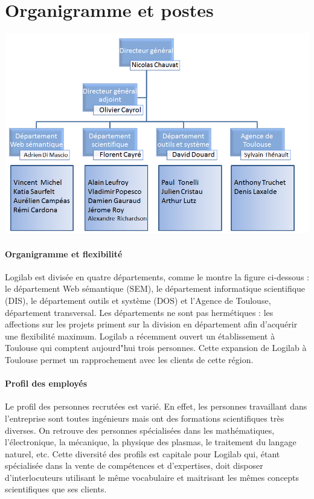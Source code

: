 \documentclass {report}
\begin{document}
\section{Organigramme et postes}

\begin{center}
\includegraphics[scale=0.7]{organigramme.png}
\end{center}



\paragraph{Organigramme et flexibilité}
Logilab est divisée en quatre départements, comme le montre la figure ci-dessous : le département Web sémantique (SEM), le département informatique scientifique (DIS), le département outils et système (DOS) et l'Agence de Toulouse, département transversal. Les départements ne sont pas hermétiques : les affections sur les projets priment sur la division en département afin d'acquérir une flexibilité maximum. Logilab a récemment ouvert un établissement à Toulouse qui comptent aujourd"hui trois personnes. Cette expansion de Logilab à Toulouse permet un rapprochement avec les clients de cette région.

\paragraph{Profil des employés}
Le profil des personnes recrutées est varié. En effet, les personnes travaillant dans l’entreprise sont toutes ingénieurs mais ont des formations scientifiques très diverses. On retrouve des personnes spécialisées dans les mathématiques, l’électronique, la mécanique, la physique des plasmas, le traitement du langage naturel, etc. Cette diversité des profils est capitale pour Logilab qui, étant spécialisée dans la vente de compétences et d’expertises, doit disposer d’interlocuteurs utilisant le même vocabulaire et maitrisant les mêmes concepts scientifiques que ses clients. 
\end{document}
